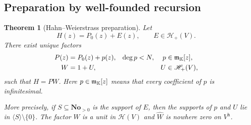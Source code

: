 \documentclass[11pt,a4paper]{article}
\newtheorem{theorem}{Theorem}[section]
\theoremstyle{definition}\newtheorem{definition}[theorem]{Definition}
\theoremstyle{remark}\newtheorem{remark}[theorem]{Remark}
\newcommand{\No}{\mathbf{No}}
\newcommand{\A}{\mathscr H}\newcommand{\hol}{\mathcal O}
\newcommand{\ev}[1]{\widehat{#1}}
\newcommand{\halo}[1]{#1^{\mathrm h}}
\numberwithin{equation}{section}
\begin{document}
\subsection{Preparation by well-founded recursion}
\begin{theorem}[Hahn--Weierstrass preparation]\label{thm:preparation}
Let
\[
 H(z)=P_0(z)+E(z),\qquad E\in\A_+(V).
\]
There exist unique factors
\begin{align*}
 P(z)&=P_0(z)+p(z), &\deg p&<N, &p&\in\infinit[z],\\
 W&=1+U, && &U&\in\A_+(V),
\end{align*}
such that $H=PW$. Here $p\in\mathfrak m_{\mathbb K}[z]$ means that every coefficient of $p$ is infinitesimal.

More precisely, if $S\subseteq\No_{>0}$ is the support of $E$, then the supports of $p$ and $U$ lie in $\langle S\rangle\setminus\{0\}$. The factor $W$ is a unit in $\A(V)$ and $\ev W$ is nowhere zero on $\halo V$.
\end{theorem}
\end{document}

